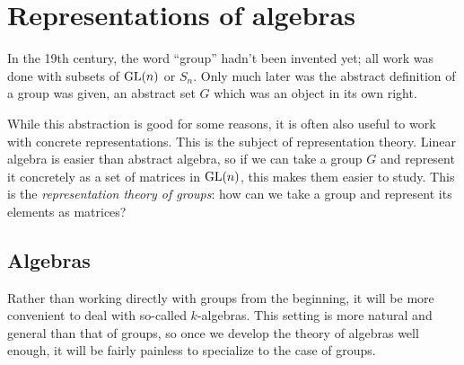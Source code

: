 \chapter{Representations of algebras}
In the 19th century, the word ``group'' hadn't been invented yet;
all work was done with subsets of $\operatorname{GL}(n)$ or $S_n$.
Only much later was the abstract definition of a group was given,
an abstract set $G$ which was an object in its own right.

While this abstraction is good for some reasons,
it is often also useful to work with concrete representations.
This is the subject of representation theory.
Linear algebra is easier than abstract algebra,
so if we can take a group $G$ and represent it concretely
as a set of matrices in $\operatorname{GL}(n)$,
this makes them easier to study.
This is the \emph{representation theory of groups}:
how can we take a group and represent its elements as matrices?

\section{Algebras}
Rather than working directly with groups from the beginning,
it will be more convenient to deal with so-called $k$-algebras.
This setting is more natural and general than that of groups,
so once we develop the theory of algebras well enough,
it will be fairly painless to specialize to the case of groups.

